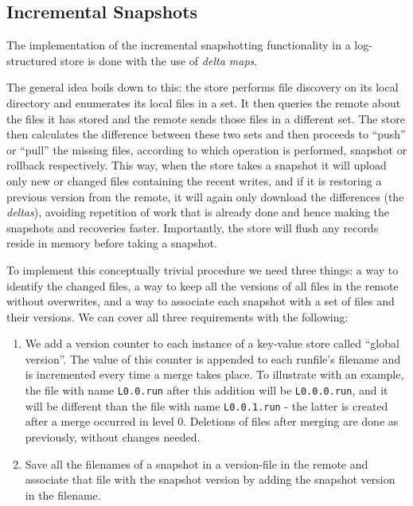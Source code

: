 \subsection{Incremental Snapshots}

The implementation of the incremental snapshotting functionality in a log-structured store is done with the use of \textit{delta maps}.

The general idea boils down to this: the store performs file discovery on its local directory and enumerates its local files in a set. It then queries the remote about the files it has stored and the remote sends those files in a different set. The store then calculates the difference between these two sets and then proceeds to ``push'' or ``pull'' the missing files, according to which operation is performed, snapshot or rollback respectively. This way, when the store takes a snapshot it will upload only new or changed files containing the recent writes, and if it is restoring a previous version from the remote, it will again only download the differences (the \textit{deltas}), avoiding repetition of work that is already done and hence making the snapshots and recoveries faster. Importantly, the store will flush any records reside in memory before taking a snapshot.

To implement this conceptually trivial procedure we need three things: a way to identify the changed files, a way to keep all the versions of all files in the remote without overwrites, and a way to associate each snapshot with a set of files and their versions. We can cover all three requirements with the following:

\begin{enumerate}
    \item We add a version counter to each instance of a key-value store called ``global version''. The value of this counter is appended to each runfile's filename and is incremented every time a merge takes place. To illustrate with an example, the file with name \verb|L0.0.run| after this addition will be \verb|L0.0.0.run|, and it will be different than the file with name \verb|L0.0.1.run| - the latter is created after a merge occurred in level 0. Deletions of files after merging are done as previously, without changes needed.
    \item Save all the filenames of a snapshot in a version-file in the remote and associate that file with the snapshot version by adding the snapshot version in the filename.
\end{enumerate}

